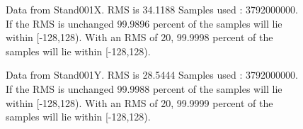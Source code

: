 \begin{figure}[ht] 				 				 				\caption{Data from Stand001X. RMS is 34.1188 Samples used : 3792000000. If the RMS is unchanged 99.9896 percent of the samples will lie within [-128,128).  				 With an RMS of 20, 99.9998 percent of the samples will lie within [-128,128).} 				\end{figure} 

\begin{figure}[ht] 				 				 				\caption{Data from Stand001Y. RMS is 28.5444 Samples used : 3792000000. If the RMS is unchanged 99.9988 percent of the samples will lie within [-128,128).  				 With an RMS of 20, 99.9999 percent of the samples will lie within [-128,128).} 				\end{figure} 


